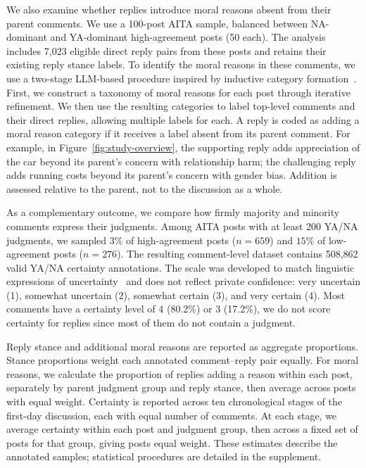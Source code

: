 We also examine whether replies introduce moral reasons absent from their parent comments.
We use a 100-post AITA sample, balanced between NA-dominant
and YA-dominant high-agreement posts (50 each). The analysis includes
7,023 eligible direct reply pairs from these posts and retains their
existing reply stance labels. 
To identify the moral reasons in these comments, we use a two-stage LLM-based procedure inspired by inductive category formation~\citep{mayring2014qualitative}.
First, we construct a taxonomy of moral reasons for each post through iterative refinement.
We then use the resulting categories to label top-level comments and their direct replies, allowing multiple labels for each.
A reply is coded as adding a moral reason category if it receives a label absent from its parent comment.
For example, in Figure~\ref{fig:study-overview}, the supporting reply
adds appreciation of the car beyond its parent's concern with relationship
harm; the challenging reply adds running costs beyond its parent's
concern with gender bias. Addition is assessed relative to the parent,
not to the discussion as a whole.


As a complementary outcome, we compare how firmly majority and minority
comments express their judgments.
Among AITA posts with at least 200 YA/NA judgments, we sampled $3\%$ of
high-agreement posts ($n=659$) and $15\%$ of low-agreement posts ($n=276$).
The resulting comment-level dataset contains 508,862 valid YA/NA
certainty annotations.
The scale was developed to match linguistic expressions of uncertainty~\cite{chen2026controversy} and does not reflect private confidence: very uncertain (1), somewhat
uncertain (2), somewhat certain (3), and very certain (4). 
Most comments have a certainty level of 4 (80.2\%) or 3 (17.2\%), we do not score certainty for replies since most of them do not contain a judgment.

Reply stance and additional moral reasons are reported as aggregate proportions. Stance proportions weight each annotated comment–reply pair equally. For moral reasons, we calculate the proportion of replies adding a reason within each post, separately by parent judgment group and reply stance, then average across posts with equal weight. Certainty is reported across ten chronological stages of the first-day discussion, each with equal number of comments. At each stage, we average certainty within each post and judgment group, then across a fixed set of posts for that group, giving posts equal weight. These estimates describe the annotated samples; statistical procedures are detailed in the supplement.

